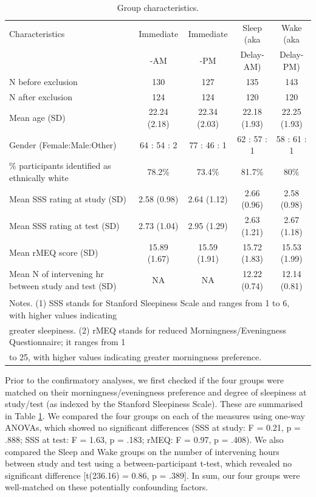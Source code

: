 \documentclass[
]{article}
\begin{document}
\begin{table}[H]

\caption{\label{tab:table3}Group characteristics.}
\centering
\fontsize{9}{11}\selectfont
\begin{tabular}[t]{lcccc}
\toprule
Characteristics & Immediate & Immediate & Sleep (aka & Wake (aka\\
 & -AM & -PM & Delay-AM) & Delay-PM)\\
\midrule
N before exclusion & 130 & 127 & 135 & 143\\
N after exclusion & 124 & 124 & 120 & 120\\
Mean age (SD) & 22.24 (2.18) & 22.34 (2.03) & 22.18 (1.93) & 22.25 (1.93)\\
\addlinespace
Gender (Female:Male:Other) & 64 : 54 : 2 & 77 : 46 : 1 & 62 : 57 : 1 & 58 : 61 : 1\\
\% participants identified as ethnically white & 78.2\% & 73.4\% & 81.7\% & 80\%\\
Mean SSS rating at study (SD) & 2.58 (0.98) & 2.64 (1.12) & 2.66 (0.96) & 2.58 (0.98)\\
Mean SSS rating at test (SD) & 2.73 (1.04) & 2.95 (1.29) & 2.63 (1.21) & 2.67 (1.18)\\
Mean rMEQ score (SD) & 15.89 (1.67) & 15.59 (1.91) & 15.72 (1.83) & 15.53 (1.99)\\
\addlinespace
Mean N of intervening hr between study and test (SD) & NA & NA & 12.22 (0.74) & 12.14 (0.81)\\
\bottomrule
\multicolumn{5}{l}{\textsuperscript{} Notes. (1) SSS stands for Stanford Sleepiness Scale and ranges from 1 to 6, with higher values indicating}\\
\multicolumn{5}{l}{greater sleepiness. (2) rMEQ stands for reduced Morningness/Eveningness Questionnaire; it ranges from 1}\\
\multicolumn{5}{l}{to 25, with higher values indicating greater morningness preference.}\\
\end{tabular}
\end{table}

Prior to the confirmatory analyses, we first checked if the four groups were matched on their morningness/eveningness preference and degree of sleepiness at study/test (as indexed by the Stanford Sleepiness Scale). These are summarised in Table \ref{tab:table3}. We compared the four groups on each of the measures using one-way ANOVAs, which showed no significant differences (SSS at study: F = 0.21, p = .888; SSS at test: F = 1.63, p = .183; rMEQ: F = 0.97, p = .408). We also compared the Sleep and Wake groups on the number of intervening hours between study and test using a between-participant t-test, which revealed no significant difference {[}t(236.16) = 0.86, p = .389{]}. In sum, our four groups were well-matched on these potentially confounding factors.
\end{document}
